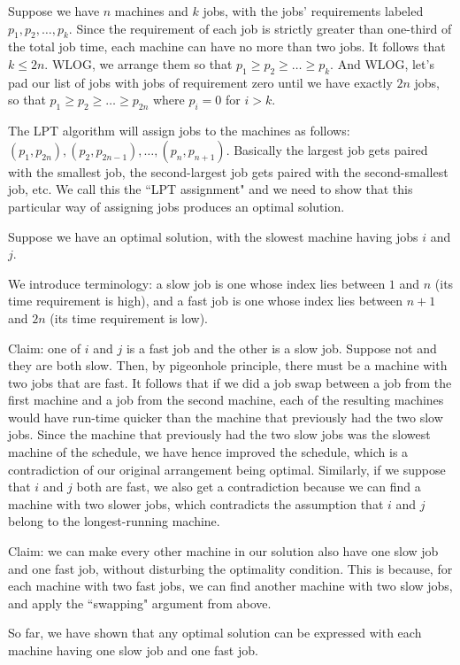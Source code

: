 \documentclass{article}
\begin{document}
Suppose we have $n$ machines and $k$ jobs, with the jobs' requirements labeled $p_1, p_2, \ldots, p_k$. Since the requirement of each job is strictly greater than one-third of the total job time, each machine can have no more than two jobs. It follows that $k \leq 2n$. WLOG, we arrange them so that $p_1 \geq p_2 \geq \ldots \geq p_k$. And WLOG, let's pad our list of jobs with jobs of requirement zero until we have exactly $2n$ jobs, so that $p_1 \geq p_2 \geq \ldots \geq p_{2n}$ where $p_i = 0$ for $i > k$.

The LPT algorithm will assign jobs to the machines as follows: $(p_1, p_{2n}), (p_2, p_{2n-1}), \ldots, (p_n, p_{n+1})$. Basically the largest job gets paired with the smallest job, the second-largest job gets paired with the second-smallest job, etc. We call this the ``LPT assignment" and we need to show that this particular way of assigning jobs produces an optimal solution.

Suppose we have an optimal solution, with the slowest machine having jobs $i$ and $j$.

We introduce terminology: a slow job is one whose index lies between $1$ and $n$ (its time requirement is high), and a fast job is one whose index lies between $n+1$ and $2n$ (its time requirement is low).

Claim: one of $i$ and $j$ is a fast job and the other is a slow job. Suppose not and they are both slow. Then, by pigeonhole principle, there must be a machine with two jobs that are fast. It follows that if we did a job swap between a job from the first machine and a job from the second machine, each of the resulting machines would have run-time quicker than the machine that previously had the two slow jobs. Since the machine that previously had the two slow jobs was the slowest machine of the schedule, we have hence improved the schedule, which is a contradiction of our original arrangement being optimal. Similarly, if we suppose that $i$ and $j$ both are fast, we also get a contradiction because we can find a machine with two slower jobs, which contradicts the assumption that $i$ and $j$ belong to the longest-running machine.

Claim: we can make every other machine in our solution also have one slow job and one fast job, without disturbing the optimality condition. This is because, for each machine with two fast jobs, we can find another machine with two slow jobs, and apply the ``swapping" argument from above. 

So far, we have shown that any optimal solution can be expressed with each machine having one slow job and one fast job.
\end{document}
